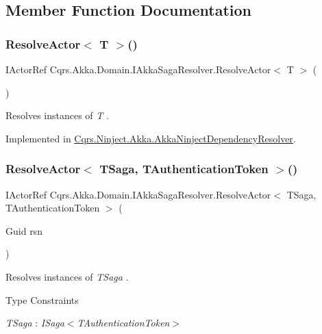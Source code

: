\subsection{Member Function Documentation}
\mbox{\label{interfaceCqrs_1_1Akka_1_1Domain_1_1IAkkaSagaResolver_adb17ca8a4e09839e67bc9fa0a6ee843f_adb17ca8a4e09839e67bc9fa0a6ee843f}} 
\subsubsection{\texorpdfstring{Resolve\+Actor$<$ T $>$()}{ResolveActor< T >()}}
{\footnotesize\ttfamily I\+Actor\+Ref Cqrs.\+Akka.\+Domain.\+I\+Akka\+Saga\+Resolver.\+Resolve\+Actor$<$ T $>$ (\begin{DoxyParamCaption}{ }\end{DoxyParamCaption})}



Resolves instances of {\itshape T} . 



Implemented in \hyperlink{classCqrs_1_1Ninject_1_1Akka_1_1AkkaNinjectDependencyResolver_a6c3399c949a77457456d77688eb66054_a6c3399c949a77457456d77688eb66054}{Cqrs.\+Ninject.\+Akka.\+Akka\+Ninject\+Dependency\+Resolver}.

\mbox{\label{interfaceCqrs_1_1Akka_1_1Domain_1_1IAkkaSagaResolver_ab41671bdbd0d7d83552b5e11e47fe36d_ab41671bdbd0d7d83552b5e11e47fe36d}} 
\subsubsection{\texorpdfstring{Resolve\+Actor$<$ T\+Saga, T\+Authentication\+Token $>$()}{ResolveActor< TSaga, TAuthenticationToken >()}}
{\footnotesize\ttfamily I\+Actor\+Ref Cqrs.\+Akka.\+Domain.\+I\+Akka\+Saga\+Resolver.\+Resolve\+Actor$<$ T\+Saga, T\+Authentication\+Token $>$ (\begin{DoxyParamCaption}\item[{Guid}]{rsn }\end{DoxyParamCaption})}



Resolves instances of {\itshape T\+Saga} . 

\begin{Desc}
\item[Type Constraints]\begin{description}
\item[{\em T\+Saga} : {\em I\+Saga$<$T\+Authentication\+Token$>$}]\end{description}
\end{Desc}
